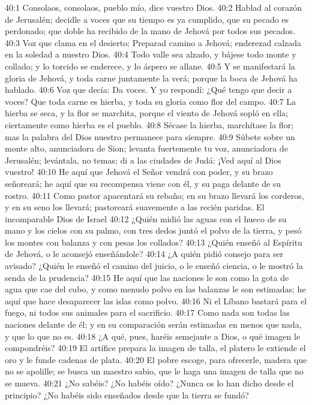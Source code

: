 40:1 Consolaos, consolaos, pueblo mío, dice vuestro Dios. 
40:2 Hablad al corazón de Jerusalén; decidle a voces que su tiempo es ya cumplido, que su pecado es perdonado; que doble ha recibido de la mano de Jehová por todos sus pecados. 
40:3 Voz que clama en el desierto: Preparad camino a Jehová; enderezad calzada en la soledad a nuestro Dios. 
40:4 Todo valle sea alzado, y bájese todo monte y collado; y lo torcido se enderece, y lo áspero se allane. 
40:5 Y se manifestará la gloria de Jehová, y toda carne juntamente la verá; porque la boca de Jehová ha hablado. 
40:6 Voz que decía: Da voces. Y yo respondí: ¿Qué tengo que decir a voces? Que toda carne es hierba, y toda su gloria como flor del campo. 
40:7 La hierba se seca, y la flor se marchita, porque el viento de Jehová sopló en ella; ciertamente como hierba es el pueblo. 
40:8 Sécase la hierba, marchítase la flor; mas la palabra del Dios nuestro permanece para siempre. 
40:9 Súbete sobre un monte alto, anunciadora de Sion; levanta fuertemente tu voz, anunciadora de Jerusalén; levántala, no temas; di a las ciudades de Judá: ¡Ved aquí al Dios vuestro! 
40:10 He aquí que Jehová el Señor vendrá con poder, y su brazo señoreará; he aquí que su recompensa viene con él, y su paga delante de su rostro. 
40:11 Como pastor apacentará su rebaño; en su brazo llevará los corderos, y en su seno los llevará; pastoreará suavemente a las recién paridas. 
El incomparable Dios de Israel 
40:12 ¿Quién midió las aguas con el hueco de su mano y los cielos con su palmo, con tres dedos juntó el polvo de la tierra, y pesó los montes con balanza y con pesas los collados? 
40:13 ¿Quién enseñó al Espíritu de Jehová, o le aconsejó enseñándole? 
40:14 ¿A quién pidió consejo para ser avisado? ¿Quién le enseñó el camino del juicio, o le enseñó ciencia, o le mostró la senda de la prudencia? 
40:15 He aquí que las naciones le son como la gota de agua que cae del cubo, y como menudo polvo en las balanzas le son estimadas; he aquí que hace desaparecer las islas como polvo. 
40:16 Ni el Líbano bastará para el fuego, ni todos sus animales para el sacrificio. 
40:17 Como nada son todas las naciones delante de él; y en su comparación serán estimadas en menos que nada, y que lo que no es. 
40:18 ¿A qué, pues, haréis semejante a Dios, o qué imagen le compondréis? 
40:19 El artífice prepara la imagen de talla, el platero le extiende el oro y le funde cadenas de plata. 
40:20 El pobre escoge, para ofrecerle, madera que no se apolille; se busca un maestro sabio, que le haga una imagen de talla que no se mueva. 
40:21 ¿No sabéis? ¿No habéis oído? ¿Nunca os lo han dicho desde el principio? ¿No habéis sido enseñados desde que la tierra se fundó? 
